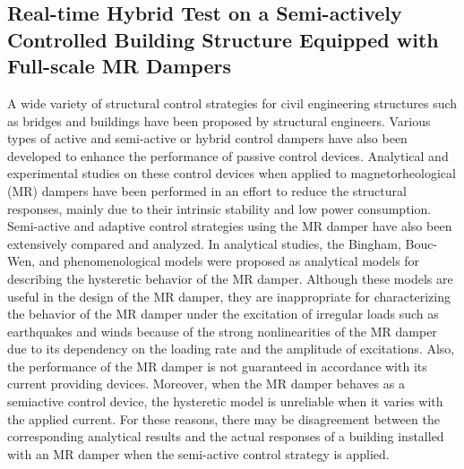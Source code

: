 \subsection{Real-time Hybrid Test on a Semi-actively Controlled Building Structure Equipped with Full-scale MR Dampers}
A wide variety of structural control strategies for civil engineering structures such as bridges and buildings have been proposed by structural engineers\citep{adeli1999control}. Various types of active and semi-active or hybrid control dampers have also been developed to enhance the performance of passive control devices\citep{kim2005hybrid1,kim2005hybrid2}. Analytical and experimental studies on these control devices when applied to magnetorheological (MR) dampers have been performed in an effort to reduce the structural responses, mainly due to their intrinsic stability and low power consumption. Semi-active and adaptive control strategies using the MR damper have also been extensively compared and analyzed\citep{jansen2000semiactive,kim2009semiactive,bitaraf2010adaptive}. In analytical studies, the Bingham, Bouc-Wen, and phenomenological models were proposed as analytical models for describing the hysteretic behavior of the MR damper\citep{spencer1997phenomenological,yang2004dynamic}. Although these models are useful in the design of the MR damper, they are inappropriate for characterizing the behavior of the MR damper under the excitation of irregular loads such as earthquakes and winds because of the strong nonlinearities of the MR damper due to its dependency on the loading rate and the amplitude of excitations. Also, the performance of the MR damper is not guaranteed in accordance with its current providing devices. Moreover, when the MR damper behaves as a semiactive control device, the hysteretic model is unreliable when it varies with the applied current\citep{lee2006semi}. For these reasons, there may be disagreement between the corresponding analytical results and the actual responses of a building installed with an MR damper when the semi-active control strategy is applied.
